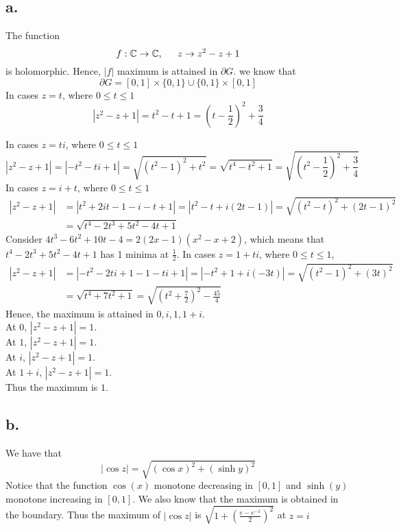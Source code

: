 \documentclass[11pt]{article}
\begin{document}
\subsection*{a.}
The function 
\[
    f: \mathbb{C} \to \mathbb{C}, \indent z \to z^2-z+1    
\]
is holomorphic. Hence, $|f|$ maximum is attained in $\partial G$. we know that 
\[
    \partial G = [0,1] \times \{0,1\} \cup \{0,1\} \times [0,1]     
\]
In cases $z = t$, where $0\le t\le 1$ 
\[
    |z^2-z+1| = t^2-t+1 = \left(t - \frac{1}{2}\right)^2 + \frac{3}{4}
\]

In cases $z = ti$, where $0\le t\le 1$ 
\[
    |z^2-z+1| = |-t^2-ti +1| = \sqrt{(t^2-1)^2 + t^2} = \sqrt{t^4 - t^2  + 1} = \sqrt{\left(t^2-\frac{1}{2}\right)^2 + \frac{3}{4}}    
\]
In cases $z = i + t$, where $0\le t\le 1$ 
\begin{equation*}
    \begin{aligned}
        |z^2-z+1| &= |t^2+2it-1 - i -t +1| = |t^2-t + i(2t-1)| = \sqrt{(t^2-t)^2 + (2t-1)^2} \\
        &= \sqrt{t^4 -2t^3 +5t^2-4t+1}  
    \end{aligned}
\end{equation*}
Consider $4t^3-6t^2 +10t-4 = 2(2x-1)(x^2-x+2)$, which means that $t^4-2t^3+5t^2-4t+1$ has 1 minima at $\frac{1}{2}$. 
In cases $z = 1+ti$, where $0\le t \le 1$, 
\begin{equation*}
    \begin{aligned}
        |z^2-z+1| &= |-t^2-2ti+1-1-ti+1| = |-t^2+1 + i(-3t)| = \sqrt{(t^2-1)^2 + (3t)^2} \\
        &= \sqrt{t^4 +7t^2 +1} = \sqrt{\left(t^2+\frac{7}{2}\right)^2 - \frac{45}{4}}  
    \end{aligned}
\end{equation*}
Hence, the maximum is attained in $0, i,1,1+i$. \\
At $0$, $|z^2-z+1| = 1$. \\
At $1$, $|z^2-z+1| = 1$. \\
At $i$, $|z^2-z+1| = 1$. \\
At $1+i$, $|z^2-z+1| = 1$. \\
Thus the maximum is $1$.
\newpage
\subsection*{b.}
We have that 
\[
    |\cos z| = \sqrt{(\cos x)^2 + (\sinh y)^2}
\]
Notice that the function $\cos(x)$ monotone decreasing in $[0,1]$ and $\sinh(y)$ monotone increasing in $[0,1]$. We also know that the maximum is obtained in the boundary. 
Thus the maximum of $|\cos z|$ is $\sqrt{1 + \left(\frac{e-e^{-1}}{2}\right)^2}$ at $z=i$
\newpage
\end{document}

